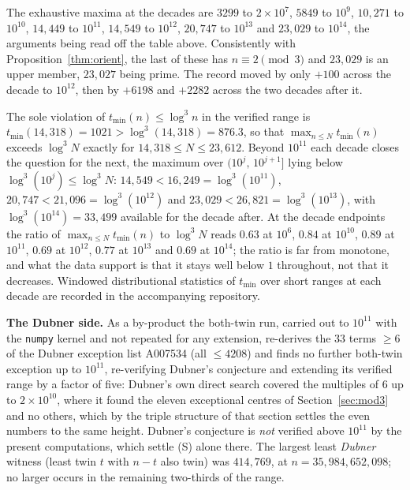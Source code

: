 \documentclass[10pt]{article}
\theoremstyle{definition}
\theoremstyle{remark}
\begin{document}
The exhaustive maxima at the decades are $3299$ to $2\times10^7$, $5849$ to
$10^9$, $10{,}271$ to $10^{10}$, $14{,}449$ to $10^{11}$, $14{,}549$ to
$10^{12}$, $20{,}747$ to $10^{13}$ and $23{,}029$ to $10^{14}$, the arguments
being read off the table above. Consistently
with Proposition~\ref{thm:orient}, the last of these has
$n \equiv 2 \pmod 3$ and $23{,}029$ is an upper member, $23{,}027$ being
prime. The record moved by only $+100$ across the decade to $10^{12}$, then by
$+6198$ and $+2282$ across the two decades after it.

The sole violation of $t_{\min}(n) \le \log^3 n$ in the verified range
is $t_{\min}(14{,}318) = 1021 > \log^3(14{,}318) = 876.3$, so that
$\max_{n \le N}t_{\min}(n)$ exceeds $\log^3 N$ exactly for
$14{,}318 \le N \le 23{,}612$. Beyond $10^{11}$ each decade closes the
question for the next, the maximum over $(10^{j},\, 10^{j+1}]$ lying below
$\log^3(10^{j}) \le \log^3 N$: $14{,}549 < 16{,}249 = \log^3(10^{11})$,
$20{,}747 < 21{,}096 = \log^3(10^{12})$ and
$23{,}029 < 26{,}821 = \log^3(10^{13})$, with $\log^3(10^{14}) = 33{,}499$
available for the decade after. At the decade endpoints the ratio of
$\max_{n \le N} t_{\min}(n)$ to $\log^3 N$ reads $0.63$ at $10^6$, $0.84$ at
$10^{10}$, $0.89$ at $10^{11}$, $0.69$ at $10^{12}$, $0.77$ at $10^{13}$ and
$0.69$ at $10^{14}$; the ratio is far from monotone, and what the data support
is that it stays well below $1$ throughout, not that it decreases. Windowed
distributional statistics of $t_{\min}$ over short ranges at each decade are
recorded in the accompanying repository.

\textbf{The Dubner side.} As a by-product the both-twin run, carried out to
$10^{11}$ with the \texttt{numpy} kernel and not repeated for any extension,
re-derives the $33$ terms $\ge 6$ of the Dubner exception list A007534 (all
$\le 4208$) and finds no further both-twin exception up to $10^{11}$,
re-verifying Dubner's conjecture and extending its verified range by a factor
of five: Dubner's own direct search \cite{Dubner} covered the multiples of $6$
up to $2 \times 10^{10}$, where it found the eleven exceptional centres of
Section~\ref{sec:mod3} and no others, which by the triple structure of that
section settles the even numbers to the same height. Dubner's conjecture is
\emph{not} verified above $10^{11}$ by the present computations, which settle
(S) alone there. The largest least \emph{Dubner} witness
(least twin $t$ with $n - t$ also twin) was $414{,}769$, at
$n = 35{,}984{,}652{,}098$; no larger occurs in the remaining two-thirds of
the range.
\end{document}

